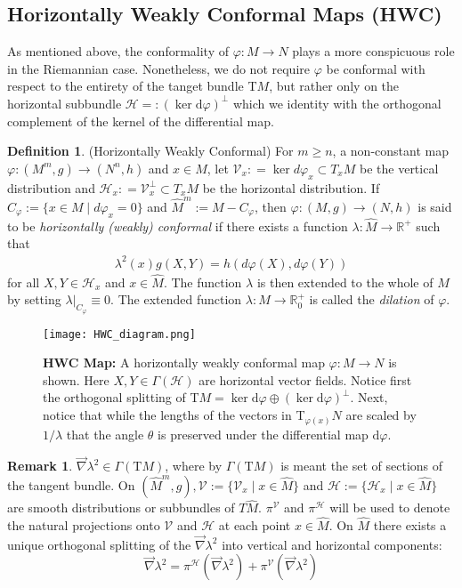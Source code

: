 \documentclass[12pt]{article}
\newcommand{\diff}{\text{d}}
\theoremstyle{definition}
\newtheorem{definition}{Definition}[section]
\newtheorem{remark}{Remark}[subsection]
\numberwithin{equation}{subsection}
\begin{document}
\subsection{Horizontally Weakly Conformal Maps (HWC)} \label{sec:HWC}
As mentioned above, the conformality of $\varphi: M\rightarrow N$ plays a more conspicuous role in the Riemannian case. Nonetheless, we do not require $\varphi$ be conformal with respect to the entirety of the tanget bundle T$M$, but rather only on the horizontal subbundle $\mathcal{H} =: (\ker \diff \varphi)^\perp$ which we identity with the orthogonal complement of the kernel of the differential map.
\begin{definition}
(Horizontally Weakly Conformal) For $m\geq n$, a non-constant map $\varphi:(M^m, g) \rightarrow (N^n, h)$ and $x \in M$, let $\mathcal{V}_x : = \ker d\varphi_x \subset T_xM$ be the vertical distribution and $\mathcal{H}_x : = \mathcal{V}_x^{\perp} \subset T_xM$ be the horizontal distribution. If $C_{\varphi} := \{ x \in M \;|\; d\varphi_x = 0\}$ and $\hat{M}^m := M - C_{\varphi}$, then $\varphi: (M, g) \rightarrow (N,h)$ is said to be \textit{horizontally (weakly) conformal} if there exists a function $\lambda: \hat{M} \rightarrow \mathbb{R}^+$ such that
\begin{align*}
\lambda^2(x) g(X, Y) = h(d\varphi(X) , d\varphi(Y))
\end{align*}
for all $X, Y \in \mathcal{H}_x$ and $x \in \hat{M}$. The function $\lambda$ is then extended to the whole of $M$ by setting $\lambda|_{C_\varphi} \equiv 0.$ The extended function $\lambda: M \rightarrow \mathbb{R}_0^+$ is called the \textit{dilation} of $\varphi$.
\end{definition}


    \begin{figure}[H]
    \centering
    \texttt{[image: HWC\_diagram.png]}
    \caption[HWC Map]{ \textbf{HWC Map:}  \small A horizontally weakly conformal map $\varphi: M \rightarrow N$ is shown. Here $X, Y \in \Gamma(\mathcal{H})$ are horizontal vector fields. Notice first the orthogonal splitting of T$M= \ker \diff \varphi \oplus  (\ker \diff \varphi)^\perp$. Next, notice that while the lengths of the vectors in T$_{\varphi(x)} N$ are scaled by $1/ \lambda$ that the angle $\theta$ is preserved under the differential map $\diff \varphi$.}
    \label{fig:HWC}
\end{figure}

\begin{remark}
$\vec{\nabla} \lambda^2 \in \Gamma(\text{T}M)$, where by $\Gamma(\text{T}M)$ is meant the set of sections of the tangent bundle. On $(\hat{M}^m, g), \mathcal{V} := \{ \mathcal{V}_x \; | \; x\in \hat{M} \}$ and $\mathcal{H} := \{ \mathcal{H}_x \; | \; x\in \hat{M} \}$ are smooth distributions or subbundles of $T\hat{M}$. $\pi^\mathcal{V}$ and $\pi^\mathcal{H}$ will be used to denote the natural projections onto $\mathcal{V}$ and $\mathcal{H}$ at each point $x \in \hat{M}$. On $\hat{M}$ there exists a unique orthogonal splitting of the $\vec{\nabla} \lambda^2$ into vertical and horizontal components:
$$
\vec{\nabla} \lambda^2 = \pi^\mathcal{H}(\vec{\nabla} \lambda^2) + \pi^\mathcal{V}(\vec{\nabla} \lambda^2)
$$
\end{remark}
\end{document}
